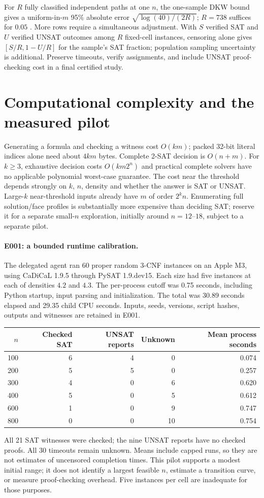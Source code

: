 \documentclass[11pt,a4paper]{article}
\begin{document}
For $R$ fully classified independent paths at one $n$, the one-sample
DKW bound gives a uniform-in-$m$ 95\% absolute error
$\sqrt{\log(40)/(2R)}$; $R=738$ suffices for $0.05$
\citep[Section 1, equation (1)]{wei2011}. More rows require a simultaneous
adjustment. With $S$ verified SAT and $U$ verified UNSAT outcomes among $R$
fixed-cell instances, censoring alone gives $[S/R,1-U/R]$ for the sample's
SAT fraction; population sampling uncertainty is additional. Preserve
timeouts, verify assignments, and include UNSAT proof-checking cost in a
final certified study.

\section{Computational complexity and the measured pilot}
Generating a formula and checking a witness cost $O(km)$; packed 32-bit
literal indices alone need about $4km$ bytes. Complete 2-SAT decision is
$O(n+m)$. For $k\ge3$, exhaustive decision costs $O(km2^n)$ and practical
complete solvers have no applicable polynomial worst-case guarantee.
The cost near the threshold depends strongly on $k$, $n$, density and whether
the answer is SAT or UNSAT. Large-$k$ near-threshold inputs already have
$m$ of order $2^k n$. Enumerating full solution/face profiles is substantially
more expensive than deciding SAT; reserve it for a separate small-$n$
exploration, initially around $n=12$--$18$, subject to a separate pilot.

\paragraph{E001: a bounded runtime calibration.}
The delegated agent ran 60 proper random 3-CNF instances on an Apple M3,
using CaDiCaL 1.9.5 through PySAT 1.9.dev15. Each size had five instances
at each of densities $4.2$ and $4.3$. The per-process cutoff was 0.75 seconds,
including Python startup, input parsing and initialization. The total was
30.89 seconds elapsed and 29.35 child CPU seconds. Inputs, seeds, versions,
script hashes, outputs and witnesses are retained in E001.
\begin{center}\small
\begin{tabular}{@{}rrrrr@{}}
\toprule
$n$ & Checked SAT & UNSAT reports & Unknown & Mean process seconds\\
\midrule
100 & 6 & 4 & 0 & 0.074\\
200 & 5 & 5 & 0 & 0.257\\
300 & 4 & 0 & 6 & 0.620\\
400 & 5 & 0 & 5 & 0.612\\
600 & 1 & 0 & 9 & 0.747\\
800 & 0 & 0 & 10 & 0.754\\
\bottomrule
\end{tabular}
\end{center}
All 21 SAT witnesses were checked; the nine UNSAT reports have no checked
proofs. All 30 timeouts remain unknown. Means include capped runs, so they
are not estimates of uncensored completion times. This pilot supports a
modest initial range; it does not identify a largest feasible $n$, estimate
a transition curve, or measure proof-checking overhead. Five instances per
cell are inadequate for those purposes.
\end{document}

